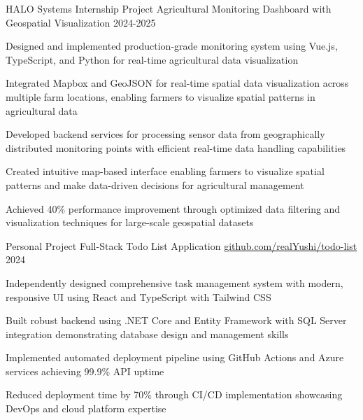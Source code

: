 \documentclass[11pt, a4paper]{awesome-cv}
\begin{document}
\begin{cventries}
  \cventry
    {HALO Systems Internship Project} %
    {Agricultural Monitoring Dashboard with Geospatial Visualization} %
    {} %
    {2024-2025} %
    {
      \begin{cvitems}
        \item {Designed and implemented production-grade monitoring system using Vue.js, TypeScript, and Python for real-time agricultural data visualization}
        \item {Integrated Mapbox and GeoJSON for real-time spatial data visualization across multiple farm locations, enabling farmers to visualize spatial patterns in agricultural data}
        \item {Developed backend services for processing sensor data from geographically distributed monitoring points with efficient real-time data handling capabilities}
        \item {Created intuitive map-based interface enabling farmers to visualize spatial patterns and make data-driven decisions for agricultural management}
        \item {Achieved 40\% performance improvement through optimized data filtering and visualization techniques for large-scale geospatial datasets}
      \end{cvitems}
    }

  \cventry
    {Personal Project} %
    {Full-Stack Todo List Application} %
    {\href{https://github.com/realYushi/todo-list}{github.com/realYushi/todo-list}} %
    {2024} %
    {
      \begin{cvitems}
        \item {Independently designed comprehensive task management system with modern, responsive UI using React and TypeScript with Tailwind CSS}
        \item {Built robust backend using .NET Core and Entity Framework with SQL Server integration demonstrating database design and management skills}
        \item {Implemented automated deployment pipeline using GitHub Actions and Azure services achieving 99.9\% API uptime}
        \item {Reduced deployment time by 70\% through CI/CD implementation showcasing DevOps and cloud platform expertise}
      \end{cvitems}
    }


\end{cventries}
\end{document}
